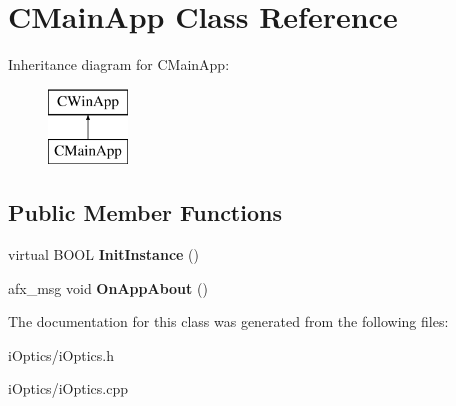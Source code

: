 \hypertarget{class_c_main_app}{}\section{C\+Main\+App Class Reference}
\label{class_c_main_app}
Inheritance diagram for C\+Main\+App\+:\begin{figure}[H]
\begin{center}
\leavevmode
\includegraphics[height=2.000000cm]{class_c_main_app}
\end{center}
\end{figure}
\subsection*{Public Member Functions}
\begin{DoxyCompactItemize}
\item 
\mbox{\label{class_c_main_app_a015a0ebfae1ea6e610095915d8976191}} 
virtual B\+O\+OL {\bfseries Init\+Instance} ()
\item 
\mbox{\label{class_c_main_app_a508ce7ca12845b706e73fb65cf83329b}} 
afx\+\_\+msg void {\bfseries On\+App\+About} ()
\end{DoxyCompactItemize}


The documentation for this class was generated from the following files\+:\begin{DoxyCompactItemize}
\item 
i\+Optics/i\+Optics.\+h\item 
i\+Optics/i\+Optics.\+cpp\end{DoxyCompactItemize}
